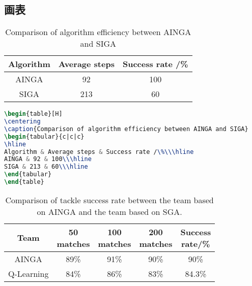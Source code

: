 \documentclass[a4paper,12pt]{article}
\begin{document}
\subsection{画表}


\begin{table}[H]
\centering
\caption{Comparison of algorithm efficiency between AINGA and SIGA}
\begin{tabular}{c|c|c}
\hline
Algorithm & Average steps & Success rate /\%\\\hline
AINGA & 92 & 100\\\hline
SIGA & 213 & 60\\\hline
\end{tabular}
\end{table}


\begin{lstlisting}[language=TeX,numbers=none,frame=lrtb,keywords={begin},label=Gamma,caption=Gamma]
\begin{table}[H]
\centering
\caption{Comparison of algorithm efficiency between AINGA and SIGA}
\begin{tabular}{c|c|c}
\hline
Algorithm & Average steps & Success rate /\%\\\hline
AINGA & 92 & 100\\\hline
SIGA & 213 & 60\\\hline
\end{tabular}
\end{table}
\end{lstlisting}



\begin{table}[H]
\centering
\caption{Comparison of tackle success rate between the team based on AINGA and the team based on SGA.}
\begin{tabular}{c|c|c|c|c}
\hline
Team & \tabincell{c}{50\\matches} & \tabincell{c}{100\\matches} & \tabincell{c}{200\\matches} & \tabincell{c}{Success \\rate/\%}  \\ \hline
AINGA & 89\% & 91\% & 90\% & 90\% \\\hline
Q-Learning & 84\% & 86\% & 83\% & 84.3\% \\\hline
\end{tabular}
\end{table}
\end{document}
